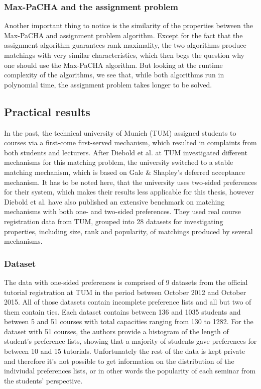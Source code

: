 \subsubsection{Max-PaCHA and the assignment problem}
Another important thing to notice is the similarity of the properties between the Max-PaCHA and assignment problem algorithm. Except for the fact that the assignment algorithm guarantees rank maximality, the two algorithms produce matchings with very similar characteristics, which then begs the question why one should use the Max-PaCHA algorithm. But looking at the runtime complexity of the algorithms, we see that, while both algorithms run in polynomial time, the assignment problem takes longer to be solved.

\subsection{Practical results}
In the past, the technical university of Munich (TUM) assigned students to courses via a first-come first-served mechanism, which resulted in complaints from both students and lecturers.\cite{tum-matching} After Diebold et al. \cite{Diebold2014} at TUM investigated different mechanisms for this matching problem, the university switched to a stable matching mechanism, which is based on Gale \& Shapley's deferred acceptance mechanism. It has to be noted here, that the university uses two-sided preferences for their system, which makes their results less applicable for this thesis, however Diebold et al. have also published an extensive benchmark on matching mechanisms with both one- and two-sided preferences.\cite{DieboldBenchmark} They used real course registration data from TUM, grouped into 28 datasets for investigating properties, including size, rank and popularity, of matchings produced by several mechanisms. 

\subsubsection{Dataset}
The data with one-sided preferences is comprised of 9 datasets from the official tutorial registration at TUM in the period between October 2012 and October 2015. All of those datasets contain incomplete preference lists and all but two of them contain ties. Each dataset contains between 136 and 1035 students and between 5 and 51 courses with total capacities ranging from 130 to 1282. For the dataset with 51 courses, the authors provide a histogram of the length of student's preference lists, showing that a majority of students gave preferences for between 10 and 15 tutorials.\cite{DieboldBenchmark} Unfortunately the rest of the data is kept private and therefore it's not possible to get information on the distribution of the indiviudal preferences lists, or in other words the popularity of each seminar from the students' perspective.

